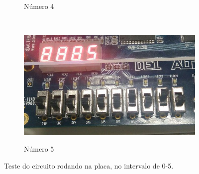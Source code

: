 \begin{figure}[H]
\begin{subfigure}[b]{0.44\textwidth}
				\label{fig:etapa1-4}
				\caption{Número 4}
			\end{subfigure}
			~
			\begin{subfigure}[b]{0.44\textwidth}
				\includegraphics[width=\textwidth]{img/etapa1/5}
				\label{fig:etapa1-5}
				\caption{Número 5}
			\end{subfigure}

			\caption{Teste do circuito rodando na placa, no intervalo de 0-5.}\label{fig:estapa1Teste1}
		\end{figure}

